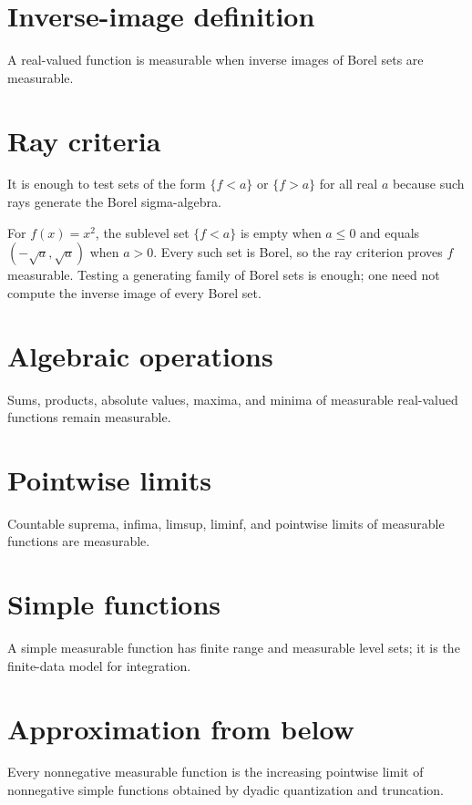 \section{Inverse-image definition}
A real-valued function is measurable when inverse images of Borel sets are measurable.

\section{Ray criteria}
It is enough to test sets of the form $\{f<a\}$ or $\{f>a\}$ for all real $a$ because such rays generate the Borel sigma-algebra.


\begin{example}\label{ex:iii02-expand-01}
For \(f(x)=x^2\), the sublevel set \(\{f<a\}\) is empty when \(a\le0\) and
equals \((-\sqrt a,\sqrt a)\) when \(a>0\). Every such set is Borel, so the
ray criterion proves \(f\) measurable. Testing a generating family of Borel
sets is enough; one need not compute the inverse image of every Borel set.
\end{example}
\section{Algebraic operations}
Sums, products, absolute values, maxima, and minima of measurable real-valued functions remain measurable.

\section{Pointwise limits}
Countable suprema, infima, limsup, liminf, and pointwise limits of measurable functions are measurable.

\section{Simple functions}
A simple measurable function has finite range and measurable level sets; it is the finite-data model for integration.

\section{Approximation from below}
Every nonnegative measurable function is the increasing pointwise limit of nonnegative simple functions obtained by dyadic quantization and truncation.



